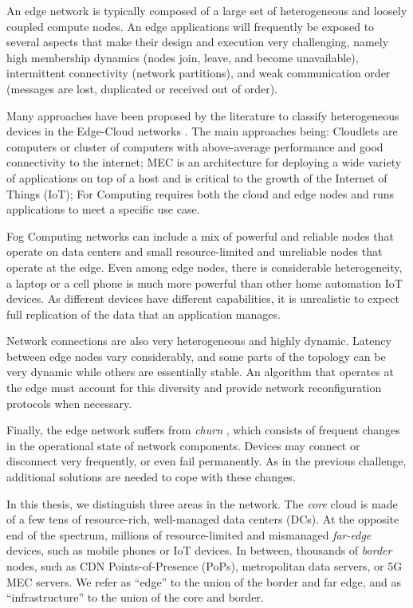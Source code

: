 An edge network is typically composed of a large set of heterogeneous and loosely coupled compute nodes. 
An edge applications will frequently be exposed to several aspects that make 
their design and execution very challenging, namely high membership dynamics (nodes join, leave, and become unavailable), intermittent connectivity (network partitions), 
and weak communication order (messages are lost, duplicated or received out of order).

Many approaches have been proposed by the literature to classify 
heterogeneous devices in the Edge-Cloud networks \cite{ai2018edge}.
The main approaches being: Cloudlets \cite{satyanarayanan2009case} 
are computers or cluster of computers with above-average performance
and good connectivity to the internet;
MEC \cite{hu2015mobile} is an architecture for deploying a wide variety 
of applications on top of a host and is critical to the growth of the Internet
of Things (IoT);
For Computing \cite{bonomi2012fog} requires both the cloud and edge nodes 
and runs applications to meet a specific use case.

Fog Computing networks can include a mix of powerful and reliable nodes that
operate on data centers and small resource-limited and unreliable nodes that
operate at the edge.
Even among edge nodes,
there is considerable heterogeneity,
a laptop or a cell phone is much more powerful than other home automation 
IoT devices.
As different devices have 
different capabilities, 
it is unrealistic to expect full replication of the data that an 
application manages.

Network connections are also very heterogeneous and highly dynamic. 
Latency between edge nodes vary considerably, 
and some parts of the topology can be very dynamic while others are essentially 
stable. 
An algorithm that operates at the edge must account for this diversity and provide 
network reconfiguration protocols when necessary.

Finally,
the edge network suffers from \textit{churn} \cite{stutzbach2006understanding},
which consists of frequent changes in the operational state of network components.
Devices may connect or disconnect very frequently,
or even fail permanently.
As in the previous challenge,
additional solutions are needed to cope with these changes.

In this thesis, we distinguish three areas in the network.
The \emph{core} cloud is made of a few tens of resource-rich,
well-managed data centers (DCs).
At the opposite end of the spectrum, millions of resource-limited and
mismanaged \emph{far-edge} devices, such as mobile phones or IoT devices.
In between, thousands of \emph{border} nodes, such as CDN
Points-of-Presence (PoPs), metropolitan data servers, or 5G MEC servers.
We refer as ``edge'' to the union of the border and far edge, and as
``infrastructure'' to the union of the core and border.

